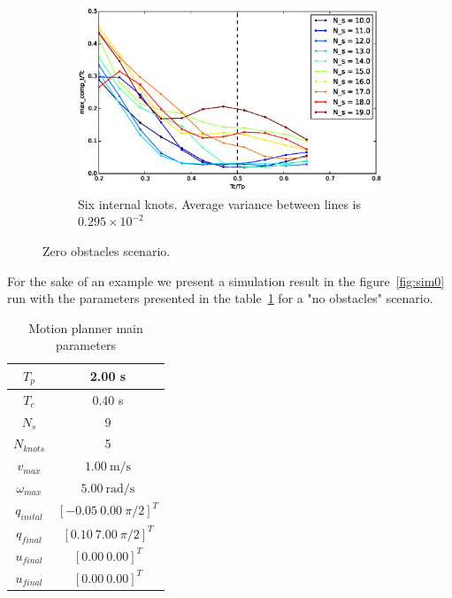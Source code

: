 \begin{figure}[!h]
        ~ %
        \begin{subfigure}[b]{0.48\textwidth}
                \includegraphics[width=\textwidth]{./img/realtime/Scenario_0__N_knots_6/mcttc-tctp.eps}
                \caption{Six internal knots. Average variance between lines is $0.295\times 10^{-2}$}\label{fig:uni06}
        \end{subfigure}%
        \caption{Zero obstacles scenario.}\label{fig:uni0}
\end{figure}

For the sake of an example we present a simulation result in the figure~\ref{fig:sim0} run with the parameters presented in the table~\ref{tab:s0param} for a "no obstacles" scenario.

\begin{table}[!h]
\caption {Motion planner main parameters} \label{tab:s0param}
\begin{center}
\begin{tabular}{|c|c|}
\hline
$T_p$ & 2.00 s\\
\hline 
$T_c$ & 0.40 s\\
\hline 
$N_s$ & 9\\
\hline 
$N_{knots}$ & 5\\
\hline
$v_{max}$ & $1.00\ \mathrm{m/s}$\\
\hline
$\omega_{max}$ & $5.00\ \mathrm{rad/s}$\\
\hline
$q_{inital}$ & $[-0.05\ 0.00\ \pi/2]^T$\\
\hline
$q_{final}$ & $[0.10\ 7.00\ \pi/2]^T$\\
\hline
$u_{final}$ & $[0.00\ 0.00]^T$\\
\hline
$u_{final}$ & $[0.00\ 0.00]^T$\\
\hline
\end{tabular}
\end{center}
\end{table}

